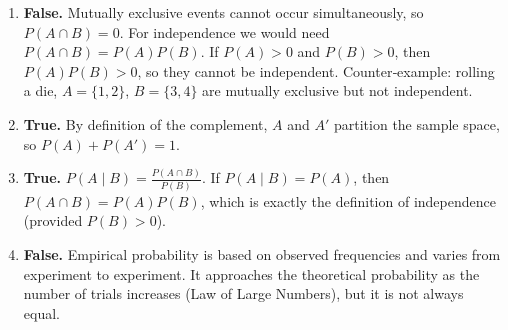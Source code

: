 \documentclass[11pt]{article}
\begin{document}
\begin{corrige}
\begin{enumerate}
\item \textbf{False.} Mutually exclusive events cannot occur simultaneously, so $P(A \cap B) = 0$. For independence we would need $P(A \cap B) = P(A)P(B)$. If $P(A)>0$ and $P(B)>0$, then $P(A)P(B) > 0$, so they cannot be independent. Counter‑example: rolling a die, $A=\{1,2\}$, $B=\{3,4\}$ are mutually exclusive but not independent.
\item \textbf{True.} By definition of the complement, $A$ and $A'$ partition the sample space, so $P(A) + P(A') = 1$.
\item \textbf{True.} $P(A \mid B) = \frac{P(A \cap B)}{P(B)}$. If $P(A \mid B) = P(A)$, then $P(A \cap B) = P(A)P(B)$, which is exactly the definition of independence (provided $P(B)>0$).
\item \textbf{False.} Empirical probability is based on observed frequencies and varies from experiment to experiment. It approaches the theoretical probability as the number of trials increases (Law of Large Numbers), but it is not always equal.
\end{enumerate}
\end{corrige}
\end{document}
